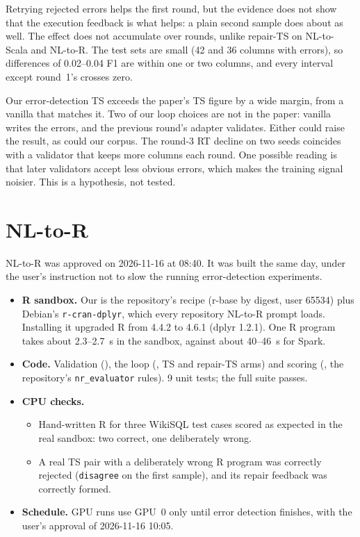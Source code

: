 \begin{interpretation}
Retrying rejected errors helps the first round, but the evidence does not show that the execution feedback is what
helps: a plain second sample does about as well. The effect does not accumulate over rounds, unlike repair-TS on
NL-to-Scala and NL-to-R. The test sets are small (42 and 36 columns with errors), so differences of 0.02--0.04 F1
are within one or two columns, and every interval except round~1's crosses zero.
\end{interpretation}

\begin{interpretation}
Our error-detection TS exceeds the paper's TS figure by a wide margin, from a vanilla that matches it.
Two of our loop choices are not in the paper: vanilla writes the errors, and the previous round's adapter validates.
Either could raise the result, as could our corpus. The round-3 RT decline on two seeds coincides with a validator that
keeps more columns each round. One possible reading is that later validators accept less obvious errors, which makes
the training signal noisier. This is a hypothesis, not tested.
\end{interpretation}

\section{NL-to-R}\label{sec:results-r}

NL-to-R was approved on 2026-11-16 at 08:40. It was built the same day, under the user's instruction not to slow the
running error-detection experiments.

\begin{itemize}
\item \textbf{R sandbox.} Our  is the repository's recipe (r-base by digest, user 65534)
plus Debian's \texttt{r-cran-dplyr}, which every repository NL-to-R prompt loads. Installing it upgraded R from 4.4.2
to 4.6.1 (dplyr 1.2.1). One R program takes about 2.3--2.7~s in the sandbox, against about 40--46~s for Spark.
\item \textbf{Code.} Validation (), the loop (, TS and repair-TS
arms) and scoring (, the repository's \texttt{nr\_evaluator} rules). 9 unit tests; the full
suite passes.
\item \textbf{CPU checks.}
  \begin{itemize}
  \item Hand-written R for three WikiSQL test cases scored as expected in the real sandbox: two correct, one deliberately
  wrong.
  \item A real TS pair with a deliberately wrong R program was correctly rejected (\texttt{disagree} on the first
  sample), and its repair feedback was correctly formed.
  \end{itemize}
\item \textbf{Schedule.} GPU runs use GPU~0 only until error detection finishes, with the user's approval of
2026-11-16 10:05.
\end{itemize}

